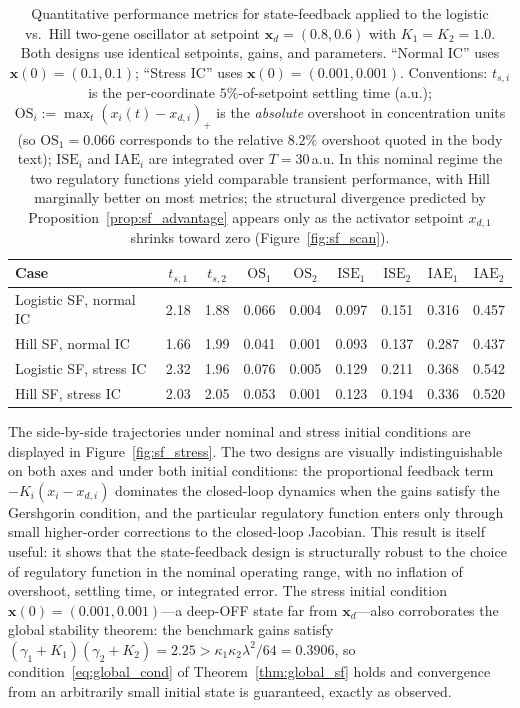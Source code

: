 \documentclass[12pt]{article}
\begin{document}
\begin{table}[tbp]
\centering
\caption{Quantitative performance metrics for state-feedback applied to
the logistic vs.\ Hill two-gene oscillator at setpoint
$\mathbf{x}_d=(0.8,0.6)$ with $K_1=K_2=1.0$. Both designs use identical
setpoints, gains, and parameters. ``Normal IC'' uses
$\mathbf{x}(0)=(0.1,0.1)$; ``Stress IC'' uses
$\mathbf{x}(0)=(0.001,0.001)$. Conventions: $t_{s,i}$ is the per-coordinate
$5\%$-of-setpoint settling time (a.u.); $\mathrm{OS}_i:=\max_t
(x_i(t)-x_{d,i})_{+}$ is the \emph{absolute} overshoot in concentration
units (so $\mathrm{OS}_1=0.066$ corresponds to the relative $8.2\%$
overshoot quoted in the body text); $\mathrm{ISE}_i$ and $\mathrm{IAE}_i$
are integrated over $T=30$\,a.u. In this nominal regime the two
regulatory functions yield comparable transient performance, with Hill
marginally better on most metrics; the structural divergence predicted
by Proposition~\ref{prop:sf_advantage} appears only as the activator
setpoint $x_{d,1}$ shrinks toward zero (Figure~\ref{fig:sf_scan}).}
\label{tab:metrics}
\footnotesize
\setlength{\tabcolsep}{4pt}
\begin{tabular}{@{}lcccccccc@{}}
\toprule
\textbf{Case}
  & $t_{s,1}$ & $t_{s,2}$
  & $\mathrm{OS}_1$ & $\mathrm{OS}_2$
  & $\mathrm{ISE}_1$ & $\mathrm{ISE}_2$
  & $\mathrm{IAE}_1$ & $\mathrm{IAE}_2$\\
\midrule
Logistic SF, normal IC & 2.18 & 1.88 & 0.066 & 0.004 & 0.097 & 0.151 & 0.316 & 0.457 \\
Hill SF, normal IC     & 1.66 & 1.99 & 0.041 & 0.001 & 0.093 & 0.137 & 0.287 & 0.437 \\
\midrule
Logistic SF, stress IC & 2.32 & 1.96 & 0.076 & 0.005 & 0.129 & 0.211 & 0.368 & 0.542 \\
Hill SF, stress IC     & 2.03 & 2.05 & 0.053 & 0.001 & 0.123 & 0.194 & 0.336 & 0.520 \\
\bottomrule
\end{tabular}
\end{table}

The side-by-side trajectories under nominal and stress initial conditions
are displayed in Figure~\ref{fig:sf_stress}. The two designs are visually
indistinguishable on both axes and under both initial conditions: the
proportional feedback term $-K_i(x_i-x_{d,i})$ dominates the closed-loop
dynamics when the gains satisfy the Gershgorin condition, and the
particular regulatory function enters only through small higher-order
corrections to the closed-loop Jacobian. This result is itself useful:
it shows that the state-feedback design is structurally robust to the
choice of regulatory function in the nominal operating range, with no
inflation of overshoot, settling time, or integrated error. The stress
initial condition $\mathbf{x}(0)=(0.001,0.001)$---a deep-OFF state far
from $\mathbf{x}_d$---also corroborates the global stability theorem:
the benchmark gains satisfy
$(\gamma_1+K_1)(\gamma_2+K_2)=2.25>\kappa_1\kappa_2\lambda^2/64=0.3906$,
so condition~\eqref{eq:global_cond} of Theorem~\ref{thm:global_sf} holds
and convergence from an arbitrarily small initial state is guaranteed,
exactly as observed.
\end{document}
